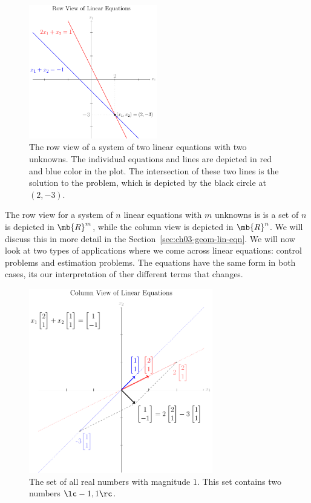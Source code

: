 \begin{figure}[h]
    \centering
    \includegraphics[width=0.5\textwidth]{figure/chapter03/lineqrowview.pdf}
    \caption{The row view of a system of two linear equations with two unknowns. The individual equations and lines are depicted in red and blue color in the plot. The intersection of these two lines is the solution to the problem, which is depicted by the black circle at $(2, -3)$.}
    \label{fig:ch03-lineq-row-view}
\end{figure}
The row view for a system of $n$ linear equations with $m$ unknowns is is a set of $n$ is depicted in $\mb{R}^m$, while the column view is depicted in $\mb{R}^n$. We will discuss this in more detail in the Section~\ref{sec:ch03-geom-lin-eqn}. We will now look at two types of applications where we come across linear equations: control problems and estimation problems. The equations have the same form in both cases, its our interpretation of ther different terms that changes.

\begin{figure}[h]
    \centering
    \includegraphics[width=0.714\textwidth]{figure/chapter03/lineqcolview.pdf}
    \caption{The set of all real numbers with magnitude $1$. This set contains two numbers $\lc -1, 1 \rc$.}
    \label{fig:ch03-lineq-col-view}
\end{figure}

